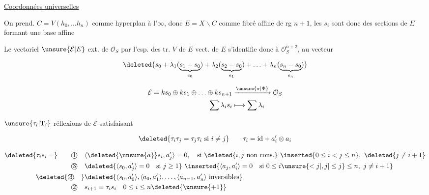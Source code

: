 
\uline{Coordonnées universelles} 

On prend. $C=V(h_0,\ldots h_n)$ comme hyperplan à l'$\infty$,  donc $E=X\smallsetminus C$ comme fibré affine de rg $n+1$, les $s_i$ sont donc des sections de $E$ formant une base affine


Le vectoriel $\unsure{\mathcal E|E}$ ext. de $\mathcal O_S$ par  l'esp. des tr. $V$ de $E$   vect. de $E$ s'identifie donc à $\mathcal O_S^{n+2}$, au vecteur  

\[
\deleted{s_0+\lambda_1(\underbrace{s_1-s_0}_{e_0})+\lambda_2(\underbrace{s_2-s_0}_{e_1})+\ldots+\lambda_{n}(\underbrace{s_n-s_0}_{e_n})}
\]

\[
\begin{aligned}
\mathcal E=k s_0\oplus k s_1\oplus\ldots\oplus k s_{n+1}&\xrightarrow{\unsure{\pi|\Phi}}\mathcal O_S\\
\sum\lambda_i s_i&\longmapsto\sum\lambda_i
\end{aligned}
\]

$\unsure{\tau_i|\mathrm T_i}$ réflexions de $\mathcal E$  satisfaisant

\[
\deleted{\tau_i\tau_j=\tau_j\tau_i\ \text{si }i\ne j}\qquad \tau_i=\mathrm{id}+a'_i\otimes a_i
\]

\[
\begin{aligned}
\deleted{\tau_i s_i=}\qquad\text{\textcircled{1}}\quad&
 \langle\deleted{\unsure{a}}s_i,a'_j\rangle=0,\quad\text{si }\deleted{i,j\ \text{non cons.}}\ \inserted{0\leq i<j\leq n},\ \deleted{j\ne i+1}\\
\text{\textcircled{3}}\quad&
 \deleted{\langle s_0,a'_j\rangle=0\quad\text{si }j\geq1}\ 
 \inserted{\langle a_j,a'_i\rangle=0\quad\text{si }0\leq i\unsure{<j|,j|\leq j}\leq n,\ j\ne i+1}\\
\deleted{\text{\textcircled{3}}\quad}&
\deleted{\langle s_0,a'_0\rangle,\langle a_0,a'_1\rangle,\ldots,\langle a_{n-1},a'_n\rangle\ \text{inversibles}}\\
\text{\textcircled{2}}\quad& s_{i+1}=\tau_i s_i\quad0\leq i\leq n\deleted{\unsure{+1}}
\end{aligned}
\]

